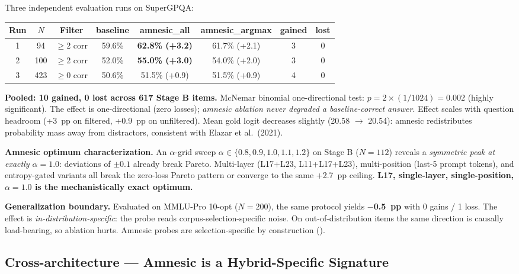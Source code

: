 \documentclass[11pt]{article}
\begin{document}
Three independent evaluation runs on SuperGPQA:

\begin{table}[h]
\centering
\begin{tabular}{cccccccc}
\toprule
Run & $N$ & Filter & baseline & amnesic\_all & amnesic\_argmax & gained & lost \\
\midrule
1 & 94 & $\geq$2 corr & 59.6\% & \textbf{62.8\% (+3.2)} & 61.7\% (+2.1) & 3 & 0 \\
2 & 100 & $\geq$2 corr & 52.0\% & \textbf{55.0\% (+3.0)} & 54.0\% (+2.0) & 3 & 0 \\
3 & 423 & $\geq$0 corr & 50.6\% & 51.5\% (+0.9) & 51.5\% (+0.9) & 4 & 0 \\
\bottomrule
\end{tabular}
\end{table}

\textbf{Pooled: 10 gained, 0 lost across 617 Stage B items.} McNemar binomial one-directional test: $p = 2 \times (1/1024) = \mathbf{0.002}$ (highly significant). The effect is one-directional (zero losses); \emph{amnesic ablation never degraded a baseline-correct answer}. Effect scales with question headroom (+3~pp on filtered, +0.9~pp on unfiltered). Mean gold logit decreases slightly (20.58 $\to$ 20.54): amnesic redistributes probability mass away from distractors, consistent with Elazar et al.\ (2021).

\textbf{Amnesic optimum characterization.} An $\alpha$-grid sweep $\alpha \in \{0.8, 0.9, 1.0, 1.1, 1.2\}$ on Stage B ($N=112$) reveals a \emph{symmetric peak at exactly $\alpha=1.0$}: deviations of $\pm 0.1$ already break Pareto. Multi-layer (L17+L23, L11+L17+L23), multi-position (last-5 prompt tokens), and entropy-gated variants all break the zero-loss Pareto pattern or converge to the same +2.7~pp ceiling. \textbf{L17, single-layer, single-position, $\alpha=1.0$ is the mechanistically exact optimum.}

\textbf{Generalization boundary.} Evaluated on MMLU-Pro 10-opt ($N=200$), the same protocol yields \textbf{$-$0.5~pp} with 0 gains / 1 loss. The effect is \emph{in-distribution-specific}: the probe reads corpus-selection-specific noise. On out-of-distribution items the same direction is causally load-bearing, so ablation hurts. Amnesic probes are selection-specific by construction (\cite{elazar2021amnesic}).

\subsection{Cross-architecture --- Amnesic is a Hybrid-Specific Signature}\label{sec:crossarch}
\end{document}
